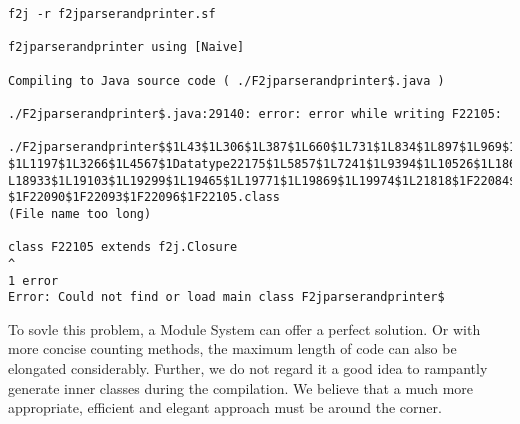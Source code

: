 \begin{itemize}
\begin{lstlisting}
f2j -r f2jparserandprinter.sf

f2jparserandprinter using [Naive]

Compiling to Java source code ( ./F2jparserandprinter$.java )

./F2jparserandprinter$.java:29140: error: error while writing F22105:

./F2jparserandprinter$$1L43$1L306$1L387$1L660$1L731$1L834$1L897$1L969$1L1050
$1L1197$1L3266$1L4567$1Datatype22175$1L5857$1L7241$1L9394$1L10526$1L18657$1
L18933$1L19103$1L19299$1L19465$1L19771$1L19869$1L19974$1L21818$1F22084$1F22087
$1F22090$1F22093$1F22096$1F22105.class
(File name too long)

class F22105 extends f2j.Closure
^
1 error
Error: Could not find or load main class F2jparserandprinter$
\end{lstlisting} 

To sovle this problem, a Module System can offer a perfect solution. Or with more concise counting methods, the maximum length of code can also be elongated considerably. Further, we do not regard it a good idea to rampantly generate inner classes during the compilation. We believe that a much more appropriate, efficient and elegant approach must be around the corner.

\end{itemize}